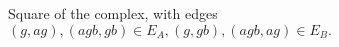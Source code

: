 \documentclass{article}
\begin{document}
\begin{multicols*}{2}
\begin{figure}[H]
\begin{center}
\begin{tikzpicture}
            \end{tikzpicture}
            \end{center}
            \caption{Square of the complex, with edges $(g,ag), (agb, gb) \in E_A,
            (g,gb), (agb, ag) \in E_B.$ \label{fig:square}
            }
            \end{figure}
 
\end{multicols*}
\end{document}
